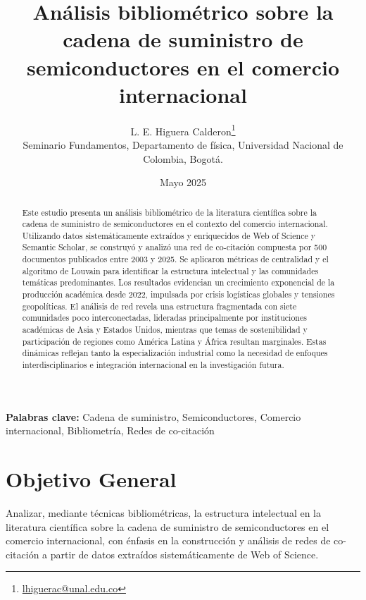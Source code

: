 \documentclass[twoside, twocolumn]{article}
\newcommand{\1}{\mathds{1}}						%
\begin{document}
    \title{\textbf{Análisis bibliométrico sobre la cadena de suministro de semiconductores en el comercio internacional}}
    \author{
        L. E. Higuera Calderon\thanks{\href{mailto:lhiguerac@unal.edu.co}{lhiguerac@unal.edu.co}}\:  \\
        \small{Seminario Fundamentos, Departamento de física, Universidad Nacional de Colombia, Bogotá.}
    }
    \date{Mayo 2025}

    \maketitle



\begin{abstract}
Este estudio presenta un análisis bibliométrico de la literatura científica sobre la cadena de suministro de semiconductores en el contexto del comercio internacional. Utilizando datos sistemáticamente extraídos y enriquecidos de Web of Science y Semantic Scholar, se construyó y analizó una red de co-citación compuesta por 500 documentos publicados entre 2003 y 2025. Se aplicaron métricas de centralidad y el algoritmo de Louvain para identificar la estructura intelectual y las comunidades temáticas predominantes. Los resultados evidencian un crecimiento exponencial de la producción académica desde 2022, impulsada por crisis logísticas globales y tensiones geopolíticas. El análisis de red revela una estructura fragmentada con siete comunidades poco interconectadas, lideradas principalmente por instituciones académicas de Asia y Estados Unidos, mientras que temas de sostenibilidad y participación de regiones como América Latina y África resultan marginales. Estas dinámicas reflejan tanto la especialización industrial como la necesidad de enfoques interdisciplinarios e integración internacional en la investigación futura.
\end{abstract}

\textbf{Palabras clave:} Cadena de suministro, Semiconductores, Comercio internacional, Bibliometría, Redes de co-citación

\section{Objetivo General}
Analizar, mediante técnicas bibliométricas, la estructura intelectual en la literatura científica sobre la cadena de suministro de semiconductores en el comercio internacional, con énfasis en la construcción y análisis de redes de co-citación a partir de datos extraídos sistemáticamente de Web of Science.
\end{document}
